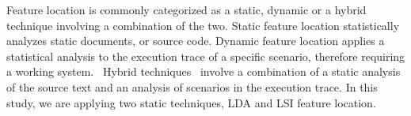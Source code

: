 Feature location is commonly categorized as a static, dynamic or a hybrid
technique involving a combination of the two.  Static feature location
statistically analyzes static documents, or source code. Dynamic feature
location applies a statistical analysis to the execution trace of a specific
scenario, therefore requiring a working system.~\cite{972777,4181710} Hybrid
techniques~\cite{1183929} involve a combination of a static analysis of the
source text and an analysis of scenarios in the execution trace. In this study,
we are applying two static techniques, LDA and LSI feature location.  
